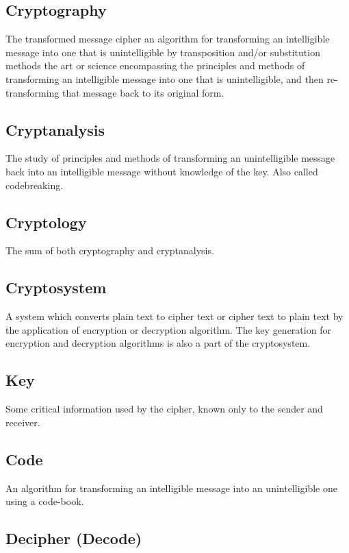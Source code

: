 \documentclass[british]{article}
\begin{document}
\subsection{Cryptography}

The transformed message cipher an algorithm for transforming an intelligible
message into one that is unintelligible by transposition and/or substitution
methods the art or science encompassing the principles and methods
of transforming an intelligible message into one that is unintelligible,
and then re-transforming that message back to its original form.

\subsection{Cryptanalysis}

The study of principles and methods of transforming an unintelligible
message back into an intelligible message without knowledge of the
key. Also called codebreaking.

\subsection{Cryptology}

The sum of both cryptography and cryptanalysis.

\subsection{Cryptosystem}

A system which converts plain text to cipher text or cipher text to
plain text by the application of encryption or decryption algorithm.
The key generation for encryption and decryption algorithms is also
a part of the cryptosystem.

\subsection{Key}

Some critical information used by the cipher, known only to the sender
and receiver.

\subsection{Code}

An algorithm for transforming an intelligible message into an unintelligible
one using a code-book.

\subsection{Decipher (Decode)}
\end{document}
